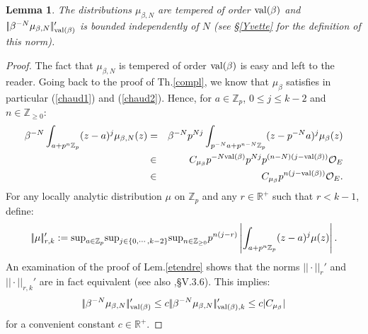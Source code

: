 \documentclass[11pt]{amsart}
\def\Z{{\mathbb Z}_p}
\def\O{{\mathcal O}_E}
\newtheorem{lem}[definit]{\bf{Lemma}}
\begin{document}
\begin{lem}\label{bounded} 
The distributions $\mu_{\beta,N}$ are tempered of order ${\rm
  val}(\beta)$ and $|\!|\beta^{-N}\mu_{\beta,N}|\!|'_{{\rm
    val}(\beta)}$ is bounded independently of $N$ (see \S\ref{Yvette}
for the definition of this norm).  
\end{lem} 
\begin{proof}
The fact that $\mu_{\beta,N}$ is tempered of order ${\rm val}(\beta)$
is easy and left to the reader. Going back to the proof of
Th.\ref{compl}, we know that $\mu_{\beta}$ satisfies in particular
(\ref{chaud1}) and (\ref{chaud2}). Hence, for $a\in \Z$, $0\leq j\leq
k-2$ and $n\in {\mathbb Z}_{\geq 0}$:  
\begin{eqnarray*} 
\beta^{-N}\int_{a+p^n\Z}(z-a)^j\mu_{\beta,N}(z)&=&\beta^{-N}p^{Nj}
\int_{p^{-N}a+p^{n-N}\Z}(z-p^{-N}a)^j\mu_{\beta}(z)\\ 
&\in & C_{\mu_{\beta}}p^{-N{\rm val}(\beta)}p^{Nj}p^{(n-N)(j-{\rm val}(\beta))}\O\\ 
&\in &C_{\mu_{\beta}}p^{n(j-{\rm val}(\beta))}\O. 
\end{eqnarray*}
For any locally analytic distribution $\mu$ on $\Z$ and any $r\in
{\mathbb R}^+$ such that $r<k-1$, define: 
$$|\!|\mu|\!|_{r,k}':={\rm sup}_{a\in\Z}
{\rm sup}_{j\in\{0,\cdots,k-2\}}{\rm sup}_{n\in{\mathbb Z}_{\geq 0}}
p^{n(j-r)}\left|\int_{a+p^n\Z}(z-a)^j\mu(z)\right|.$$ 
An examination of the proof of Lem.\ref{etendre} shows that the norms
$|\!|\cdot |\!|_{r}'$ and $|\!|\cdot |\!|_{r,k}'$ are in fact
equivalent (see also \cite{Co2},\S V.3.6). This implies: 
$$|\!|\beta^{-N}\mu_{\beta,N}|\!|'_{{\rm val}(\beta)}\leq
c|\!|\beta^{-N}\mu_{\beta,N}|\!|'_{{\rm val}(\beta),k}\leq
c|C_{\mu_{\beta}}|$$  
for a convenient constant $c\in {\mathbb R}^+$.  
\end{proof} 
 
\end{document}
